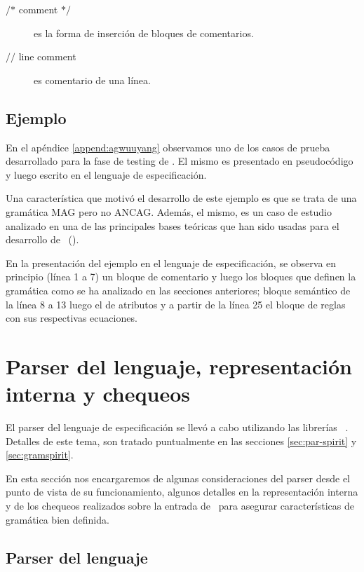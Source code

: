 \begin{description}
\item [$\textbf{/*}$ comment $\textbf{*/}$] es la forma de inserción de bloques de comentarios.
\item [$\textbf{//}$ line comment] es comentario de una línea.
\end{description} 

\subsection{Ejemplo}

En el apéndice \ref{append:agwuuyang} observamos uno de los casos de prueba desarrollado para la fase de testing de \maggen. El mismo es presentado en pseudocódigo y luego escrito en el lenguaje de especificación. 

Una característica que motivó el desarrollo de este ejemplo es que se trata de una gramática MAG pero no ANCAG. Además, el mismo, es un caso de estudio analizado en una de las principales bases teóricas que han sido usadas para el desarrollo de \maggen\ (\cite{wuu-yang1}). 

En la presentación del ejemplo en el lenguaje de especificación, se observa en principio (línea 1 a 7) un bloque de comentario y luego los bloques que definen la gramática como se ha analizado en las secciones anteriores; bloque semántico de la línea 8 a 13 luego el de atributos y a partir de la línea 25 el bloque de reglas con sus respectivas ecuaciones.

 
\section{Parser del lenguaje, representación interna y chequeos}

El parser del lenguaje de especificación se llevó a cabo utilizando las librerías \boost\ \spirit. Detalles de este tema, son tratado puntualmente en las secciones \ref{sec:par-spirit} y \ref{sec:gramspirit}. 

En esta sección nos encargaremos de algunas consideraciones del parser desde el punto de vista de su funcionamiento, algunos detalles en la representación interna y de los chequeos realizados sobre la entrada de \maggen\ para asegurar características de gramática bien definida.

\subsection*{Parser del lenguaje}

